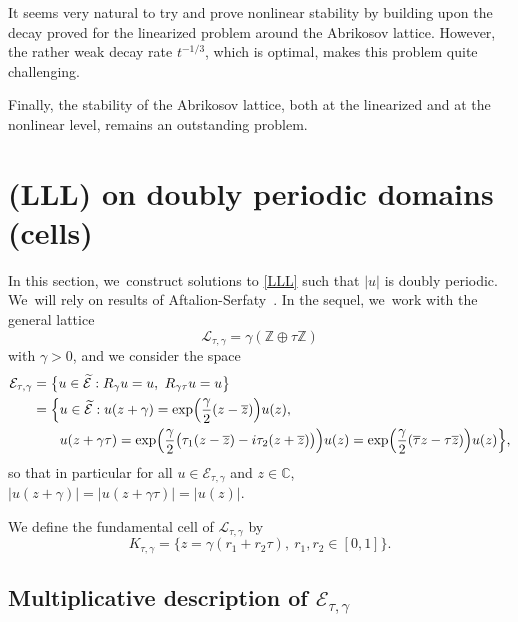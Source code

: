 \documentclass[10pt]{amsart}
\theoremstyle{definition}
\let\EE\exp
\let\ov\overline
\newcommand\E{\mathcal E}
\let\Subsection\subsection\let\Subsubsection\subsubsection
\begin{document}
It seems very natural to try and prove nonlinear stability by building upon the decay proved for the linearized problem around the Abrikosov lattice. However, the rather weak decay rate $t^{-1/3}$, which is optimal, makes this problem quite challenging.

Finally, the stability of the Abrikosov lattice, both at the linearized and at the nonlinear level, remains an outstanding problem.

\section{(LLL) on doubly periodic domains (cells)}
\label{section2}

In this section, we~construct solutions to \eqref{LLL} such that $\vert u\vert$ is doubly periodic. We~will rely on results of Aftalion-Serfaty~\cite[\S 3]{AftaSerfa}. In the sequel, we~work with the general lattice
\[
\mathcal{L}_{\tau,\gamma} = \gamma(\mathbb{Z}\oplus \tau \mathbb{Z})
\]
with $\gamma>0 $, and we consider the space
\begin{align*}
\mathcal{E}_{\tau,\gamma}&=\bigl\{u\in \widetilde{\mathcal{E}}: R_\gamma u=u,\ R_{\gamma \tau} u=u\bigr\}\\
&=\Bigl\{u\in \widetilde{\mathcal{E}}: u(z+\gamma)=\EE\Bigl({\frac{\gamma}2(z-\ov{z})}\Bigr) u(z), \\
&\qquad u(z+\gamma\tau)=\EE\Bigl(\frac{\gamma}2 \bigl(\tau_1(z-\ov{z})-i\tau_2(z+\ov{z})\bigr)\Bigr) u(z)=\EE\Bigl(\frac{\gamma}{2}(\ov{\tau}z-\tau\ov{z})\Bigr) u(z)\Bigr\},
\end{align*}
so that in particular for all $u \in \mathcal{E}_{\tau,\gamma}$ and $z\in\mathbb{C}$, $\vert u(z+\gamma)\vert= \vert u(z+\gamma\tau)\vert=\vert u(z)\vert$. 

We define the fundamental cell of $\mathcal{L}_{\tau,\gamma}$ by
\begin{equation*}
K_{\tau,\gamma}=\bigl\{z=\gamma(r_{1}+r_{2}\tau),\ r_{1},r_{2}\in[0,1]\bigr\}.
\end{equation*}

\Subsection{Multiplicative description of $\E_{\tau,\gamma}$}
\end{document}
